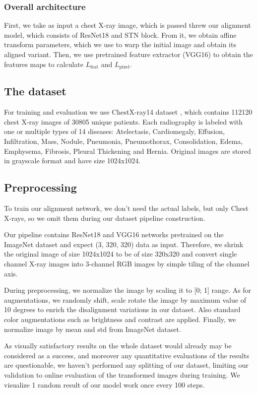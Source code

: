 \documentclass{article}
\begin{document}
\subsubsection{Overall architecture}

First, we take as input a chest X-ray image, which is passed threw our alignment 
model, which consists of ResNet18 and STN block. From it, we obtain affine transform 
parameters, which we use to warp the initial image and obtain its aligned variant. 
Then, we use pretrained feature extractor (VGG16) to obtain the features maps to 
calculate $L_{\text{feat}}$ and $ L_{\text{pixel}} $.


\subsection{The dataset}
For training and evaluation we use ChestX-ray14 dataset \cite{DataSet}, which 
contains 112120 chest X-ray images of 30805 unique patients. Each radiography 
is labeled with one or multiple types of 14 diseases: Atelectasis, 
Cardiomegaly, Effusion, Infiltration, Mass, Nodule, Pneumonia, Pneumothorax, 
Consolidation, Edema, Emphysema, Fibrosis, Pleural Thickening and Hernia. 
Original images are stored in grayscale format and have size 1024x1024. 

\subsection{Preprocessing}
To train our alignment network, we don't need the actual labels, but only Chest 
X-rays, so we omit them during our dataset pipeline construction.

Our pipeline contains ResNet18 and VGG16 networks pretrained on the ImageNet 
dataset \cite{ImageNet} and expect (3, 320, 320) data as input. Therefore, we 
shrink the original image of size 1024x1024 to be of size 320x320 and convert 
single channel X-ray images into 3-channel RGB images by simple tiling of the 
channel axis.

During preprocessing, we normalize the image by scaling it to [0; 1] range. As 
for augmentations, we randomly shift, scale rotate the image by maximum value 
of 10 degrees to enrich the disalignment variations in our dataset. Also 
standard color augmentations such as brightness and contrast are applied. 
Finally, we normalize image by mean and std from ImageNet dataset.

As visually satisfactory results on the whole dataset would already may be 
considered as a success, and moreover any quantitative evaluations of the 
results are questionable, we haven't performed any splitting of our dataset, 
limiting our validation to online evaluation of the transformed images during 
training. We visualize 1 random result of our model work once every 100 steps.
\end{document}
